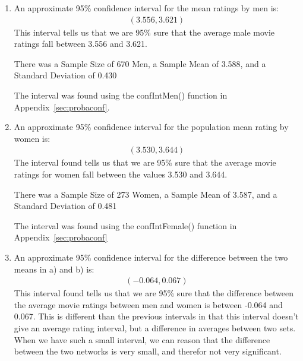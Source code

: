\documentclass[11pt]{article}  %
\begin{document}
\begin{enumerate}
    \item An approximate 95\% confidence interval for the mean ratings by men is:
    \begin{align*}
        (3.556, 3.621) 
    \end{align*}
    This interval tells us that we are 95\% sure that the average male movie ratings fall between 3.556 and 3.621.
    
    There was a Sample Size of 670 Men, a Sample Mean of 3.588, and a Standard Deviation of 0.430
    
    The interval was found using the confIntMen() function in Appendix~\ref{sec:probaconf}.
    
    \item An approximate 95\% confidence interval for the population mean rating by women is:
    \begin{align*}
        (3.530, 3.644)
    \end{align*}
    The interval found tells us that we are 95\% sure that the average movie ratings for women fall between the values 3.530 and 3.644.
    
    There was a Sample Size of 273 Women, a Sample Mean of 3.587, and a Standard Deviation of 0.481
    
    The interval was found using the confIntFemale() function in Appendix~\ref{sec:probaconf} 
    
    \item An approximate 95\% confidence interval for the difference between the two means in a) and b) is:
    \begin{align*}
        (-0.064, 0.067)
    \end{align*}
    This interval found tells us that we are 95\% sure that the difference between the average movie ratings between men and women is between -0.064 and 0.067. This is different than the previous intervals in that this interval doesn't give an average rating interval, but a difference in averages between two sets. When we have such a small interval, we can reason that the difference between the two networks is very small, and therefor not very significant. 
    

\end{enumerate}
\end{document}
